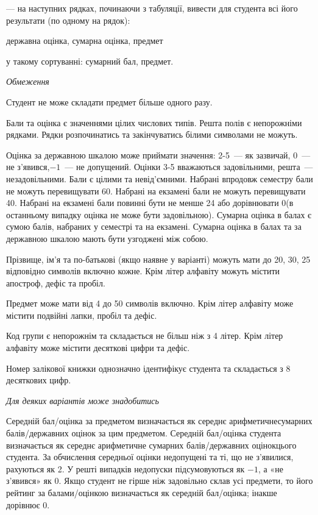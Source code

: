 \documentclass[11pt, ukrainian]{article}
\begin{document}
{\noindent}--- на наступних рядках, починаючи з табуляції, вивести для студента всі його результати (по одному на рядок):\par
державна оцінка, сумарна оцінка, предмет

{\noindent}у такому сортуванні: сумарний бал, предмет.


\bigskip\textit{Обмеження}

Студент не може складати предмет більше одного разу.

Бали та оцінка є значеннями цілих числових типів. Решта полів є непорожніми рядками.
Рядки розпочинатись та закінчуватись білими символами не можуть.

Оцінка за державною шкалою може приймати значення: 2-5~--- як зазвичай, 0~--- не з’явився,$-1$~--- не допущений. 
Оцінки 3-5 вважаються задовільними, решта~--- незадовільними. 
Бали є цілими та невід’ємними.
Набрані впродовж семестру бали не можуть перевищувати 60. 
Набрані на екзамені бали не можуть перевищувати 40. 
Набрані на екзамені бали повинні бути не менше 24 або дорівнювати 0(в останньому випадку оцінка не може бути задовільною). 
Сумарна оцінка в балах є сумою балів, набраних у семестрі та на екзамені.
Сумарна оцінка в балах та за державною шкалою мають бути узгоджені між собою.

Прізвище, ім’я та по-батькові (якщо наявне у варіанті) можуть мати до 20, 30, 25 відповідно символів включно кожне. 
Крім літер алфавіту можуть містити апостроф, дефіс та пробіл.

Предмет може мати від 4 до 50 символів включно. 
Крім літер алфавіту може містити подвійні лапки, пробіл та дефіс.

Код групи є непорожнім та складається не більш ніж з 4 літер. 
Крім літер алфавіту може містити десяткові цифри та дефіс.


Номер залікової книжки однозначно ідентифікує студента та складається з 8 десяткових цифр. 

\bigskip\textit{Для деяких варіантів може знадобитись}

Середній бал/оцінка за предметом визначається як середнє арифметичнесумарних балів/державних оцінок за цим предметом. 
Середній бал/оцінка студента визначається як середнє арифметичне сумарних балів/державних оцінокцього студента. 
За обчислення середньої оцінки недопущені та ті, що не з’явилися, рахуються як 2.
У решті випадків недопуски підсумовуються як $-1$, а «не з’явився» як 0.
Якщо студент не гірше ніж задовільно склав усі предмети, 
то його рейтинг за балами/оцінкою визначається як середній бал/оцінка; інакше дорівнює 0.
\end{document}
